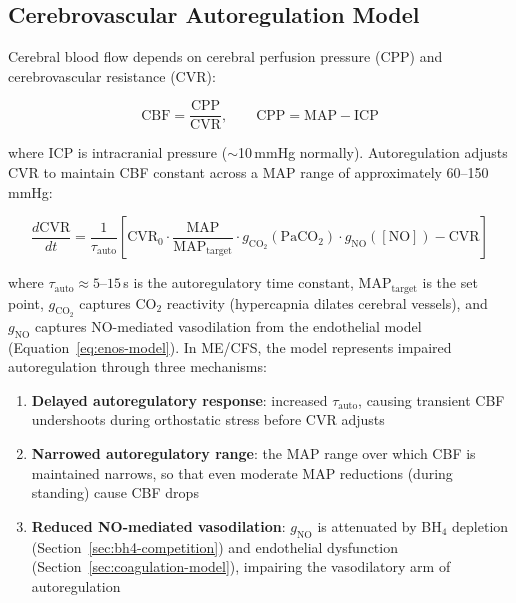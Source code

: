 \subsection{Cerebrovascular Autoregulation Model}

Cerebral blood flow depends on cerebral perfusion pressure (CPP) and cerebrovascular resistance (CVR):

\begin{equation}
\label{eq:cbf-model}
\text{CBF} = \frac{\text{CPP}}{\text{CVR}}, \qquad \text{CPP} = \text{MAP} - \text{ICP}
\end{equation}

where ICP is intracranial pressure ($\sim$10\,mmHg normally). Autoregulation adjusts CVR to maintain CBF constant across a MAP range of approximately 60--150\,mmHg:

\begin{equation}
\label{eq:cvr-autoregulation}
\frac{d\text{CVR}}{dt} = \frac{1}{\tau_{\text{auto}}} \left[ \text{CVR}_0 \cdot \frac{\text{MAP}}{\text{MAP}_{\text{target}}} \cdot g_{\text{CO}_2}(\text{PaCO}_2) \cdot g_{\text{NO}}([\text{NO}]) - \text{CVR} \right]
\end{equation}

where $\tau_{\text{auto}} \approx 5$--$15$\,s is the autoregulatory time constant, $\text{MAP}_{\text{target}}$ is the set point, $g_{\text{CO}_2}$ captures CO$_2$ reactivity (hypercapnia dilates cerebral vessels), and $g_{\text{NO}}$ captures NO-mediated vasodilation from the endothelial model (Equation~\ref{eq:enos-model}). In ME/CFS, the model represents impaired autoregulation through three mechanisms:

\begin{enumerate}
    \item \textbf{Delayed autoregulatory response}: increased $\tau_{\text{auto}}$, causing transient CBF undershoots during orthostatic stress before CVR adjusts
    \item \textbf{Narrowed autoregulatory range}: the MAP range over which CBF is maintained narrows, so that even moderate MAP reductions (during standing) cause CBF drops
    \item \textbf{Reduced NO-mediated vasodilation}: $g_{\text{NO}}$ is attenuated by BH$_4$ depletion (Section~\ref{sec:bh4-competition}) and endothelial dysfunction (Section~\ref{sec:coagulation-model}), impairing the vasodilatory arm of autoregulation
\end{enumerate}

